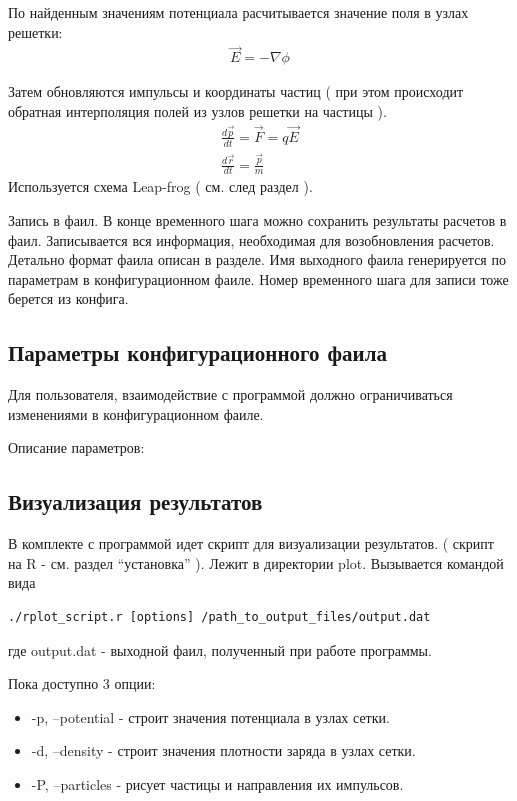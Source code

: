 По найденным значениям потенциала расчитывается значение поля в узлах решетки:
\begin{gather}
  \vec{ E } = - \nabla \phi
\end{gather}

Затем обновляются импульсы и координаты частиц
( при этом происходит обратная интерполяция полей из узлов решетки на частицы ).
\begin{gather}
  \frac{ d \vec{p} }{ d t } = \vec{ F } = q \vec{ E }
  \\
  \frac{ d \vec{r} }{ d t } = \frac{ \vec{p} }{ m }
\end{gather}
Используется схема Leap-frog ( см. след раздел ).

Запись в фаил. 
В конце временного шага можно сохранить результаты расчетов в фаил. 
Записывается вся информация, необходимая для возобновления расчетов.
Детально формат фаила описан в  разделе. 
Имя выходного фаила генерируется по параметрам в конфигурационном фаиле.
Номер временного шага для записи тоже берется из конфига.




\subsection{ Параметры конфигурационного фаила }

Для пользователя, взаимодействие с программой должно ограничиваться изменениями в конфигурационном фаиле.


Описание параметров:

\subsection{ Визуализация результатов }

В комплекте с программой идет скрипт для визуализации результатов.
( скрипт на R - см. раздел ``установка'' ).
Лежит в директории plot. Вызывается командой вида
\begin{verbatim}
./rplot_script.r [options] /path_to_output_files/output.dat
\end{verbatim}
где output.dat - выходной фаил, полученный при работе программы.

Пока доступно 3 опции: 
\begin{itemize}
\item -p, --potential - строит значения потенциала в узлах сетки.
\item -d, --density - строит значения плотности заряда в узлах сетки.
\item -P, --particles - рисует частицы и направления их импульсов.
\end{itemize}

